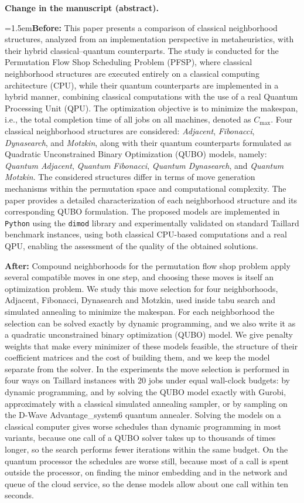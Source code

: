 \documentclass[12pt]{article}
\newcommand{\change}[3]{\par\smallskip\noindent\textbf{Change in the manuscript (#1).}\par
  {\leftskip=1.5em\noindent\textbf{Before:} #2\par\noindent\textbf{After:} #3\par}}
\begin{document}
\change{abstract}{This paper presents a comparison of classical neighborhood structures, analyzed from an implementation perspective in metaheuristics, with their hybrid classical--quantum counterparts. The study is conducted for the Permutation Flow Shop Scheduling Problem (PFSP), where classical neighborhood structures are executed entirely on a classical computing architecture (CPU), while their quantum counterparts are implemented in a hybrid manner, combining classical computations with the use of a real Quantum Processing Unit (QPU). The optimization objective is to minimize the makespan, i.e., the total completion time of all jobs on all machines, denoted as $C_{\max}$. Four classical neighborhood structures are considered: \emph{Adjacent}, \emph{Fibonacci}, \emph{Dynasearch}, and \emph{Motzkin}, along with their quantum counterparts formulated as Quadratic Unconstrained Binary Optimization (QUBO) models, namely: \emph{Quantum Adjacent}, \emph{Quantum Fibonacci}, \emph{Quantum Dynasearch}, and \emph{Quantum Motzkin}. The considered structures differ in terms of move generation mechanisms within the permutation space and computational complexity. The paper provides a detailed characterization of each neighborhood structure and its corresponding QUBO formulation. The proposed models are implemented in \texttt{Python} using the \texttt{dimod} library and experimentally validated on standard Taillard benchmark instances, using both classical CPU-based computations and a real QPU, enabling the assessment of the quality of the obtained solutions.}{Compound neighborhoods for the permutation flow shop problem apply several compatible moves in one step, and choosing these moves is itself an optimization problem. We study this move selection for four neighborhoods, Adjacent, Fibonacci, Dynasearch and Motzkin, used inside tabu search and simulated annealing to minimize the makespan. For each neighborhood the selection can be solved exactly by dynamic programming, and we also write it as a quadratic unconstrained binary optimization (QUBO) model. We give penalty weights that make every minimizer of these models feasible, the structure of their coefficient matrices and the cost of building them, and we keep the model separate from the solver. In the experiments the move selection is performed in four ways on Taillard instances with 20 jobs under equal wall-clock budgets: by dynamic programming, and by solving the QUBO model exactly with Gurobi, approximately with a classical simulated annealing sampler, or by sampling on the D-Wave Advantage\_system6 quantum annealer. Solving the models on a classical computer gives worse schedules than dynamic programming in most variants, because one call of a QUBO solver takes up to thousands of times longer, so the search performs fewer iterations within the same budget. On the quantum processor the schedules are worse still, because most of a call is spent outside the processor, on finding the minor embedding and in the network and queue of the cloud service, so the dense models allow about one call within ten seconds.}
\end{document}
